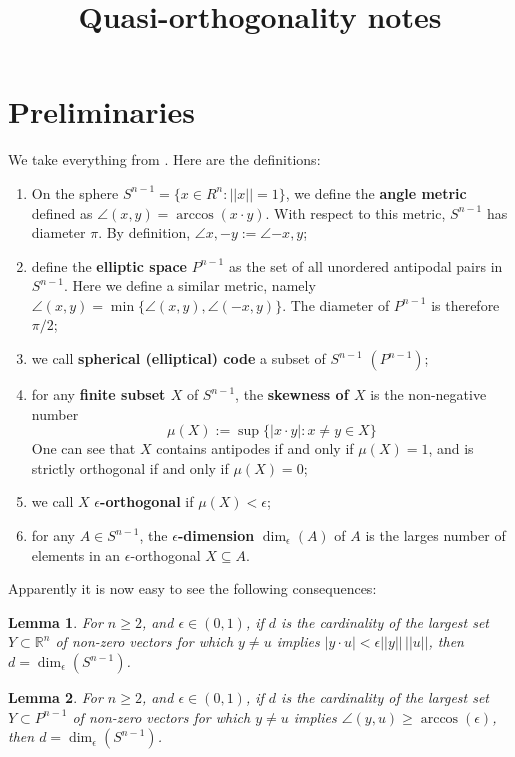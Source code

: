 \documentclass[a4paper, 10pt]{article}
\title{Quasi-orthogonality notes}
\author{}
\newtheorem{lemma}{Lemma}
\newcommand{\rn}{\mathbb{R}^n}
\newcommand{\SN}{S^{n-1}}
\newcommand{\PN}{P^{n-1}}
\begin{document}
  \maketitle

  \section{Preliminaries}
  We take everything from \cite{kainen1992}. Here are the definitions:
  
  \begin{enumerate}
    \item On the sphere $\SN = \{x \in R^n : ||x|| = 1\}$, we define the
      \textbf{angle metric} defined as $\angle(x,y) = \arccos(x\cdot y)$. With
      respect to this metric, $\SN$ has diameter $\pi$. By definition,
      $\angle{x,-y} := \angle{-x,y}$;
    \item define the \textbf{elliptic space} $\PN$ as the set of all
      unordered antipodal pairs in $S^{n-1}$. Here we define a similar metric,
      namely $\angle(x,y) = \min\{\angle(x,y), \angle(-x,y) \}$. The diameter of
      $\PN$ is therefore $\pi/2$;
    \item we call \textbf{spherical (elliptical) code} a subset of $\SN$
      $(\PN)$;
    \item for any \textbf{finite subset $X$} of $\SN$, the \textbf{skewness of
      $X$} is the non-negative number
      $$ \mu(X) := \sup\{|x \cdot y| : x \neq y \in X\}$$
      One can see that $X$ contains antipodes if and only if $\mu(X) = 1$, and
      is strictly orthogonal if and only if $\mu(X) = 0$;
    \item we call $X$ \textbf{$\epsilon$-orthogonal} if $\mu(X) < \epsilon$;
    \item for any $A \in \SN$, the \textbf{$\epsilon$-dimension}
      $\dim_{\epsilon}(A)$ of $A$ is the larges number of elements in an
      $\epsilon$-orthogonal $X \subseteq A$.
  \end{enumerate}

  Apparently it is now easy to see the following consequences:

  \begin{lemma}
    For $n\geq 2$, and $\epsilon \in (0,1)$, if $d$ is the cardinality of the
    largest set $Y \subset \rn $ of non-zero vectors for which $y\neq u$ implies
    $|y \cdot u | < \epsilon ||y|| \, ||u||$, then $d = \dim_{\epsilon}(\SN)$.
  \end{lemma}

  \begin{lemma}
    For $n\geq 2$, and $\epsilon \in (0,1)$, if $d$ is the cardinality of the
    largest set $Y \subset \PN $ of non-zero vectors for which $y\neq u$ implies
    $\angle(y,u) \geq \arccos(\epsilon) $, then $d = \dim_{\epsilon}(\SN)$.
  \end{lemma}
\end{document}
